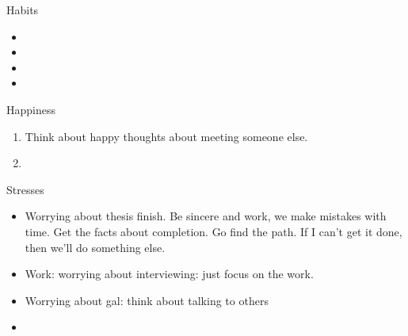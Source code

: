 \documentclass[serif, mathserif, final]{beamer}
\begin{document}
\begin{frame}{} 
  \begin{columns}
    \begin{column}{0.25\linewidth} %
      \begin{block}{Habits}
        \begin{itemize}
          \tiny \item \tiny 
        \item \tiny 
        \item \tiny 
        \item \tiny 
        \end{itemize}
      \end{block}
      \begin{block}{Happiness}  
        \begin{enumerate}
          \tiny \item \tiny Think about happy thoughts about meeting
          someone else.  
        \item \tiny 
        \end{enumerate}
      \end{block} 

      \begin{block}{Stresses}
        \begin{itemize}
          \tiny \item \tiny Worrying about thesis finish. Be sincere
          and work, we make mistakes with time. Get the facts about
          completion. Go find the path. If I can't get it done, then we'll do
          something else. 
        \item \tiny Work: worrying about interviewing: just
          focus on the work. 
        \item \tiny Worrying about gal: think about talking to
          others 
        \item \tiny 
        \end{itemize} 
      \end{block}
 

\end{column}
\end{columns}
\end{frame}
\end{document}

